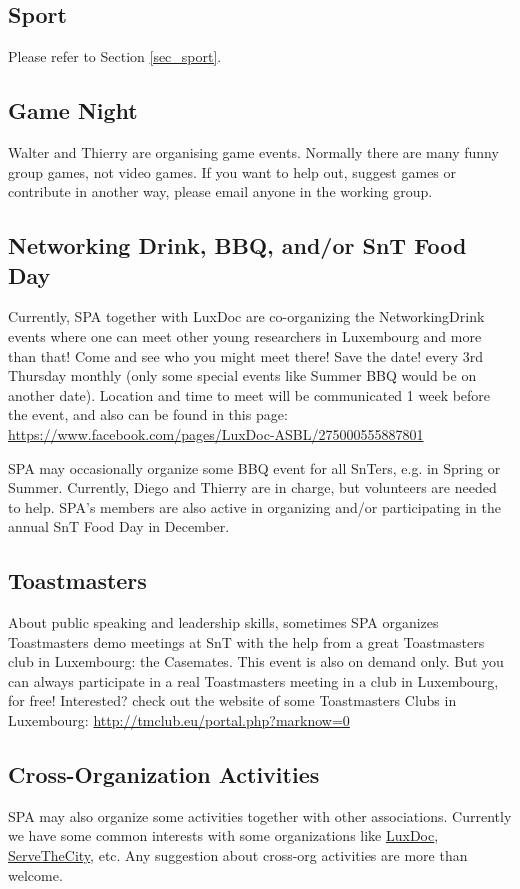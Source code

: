 \subsection{Sport}
Please refer to Section \ref{sec_sport}. 

\subsection{Game Night}
Walter and Thierry are organising game events. 
Normally there are many funny group games, not video games. 
If you want to help out, suggest games or contribute in another way, please email anyone in the working group.

\subsection{Networking Drink, BBQ, and/or SnT Food Day}
Currently, SPA together with LuxDoc are co-organizing the NetworkingDrink events where one can meet other young researchers in Luxembourg and more than that!
Come and see who you might meet there! 
Save the date! every 3rd Thursday monthly (only some special events like Summer BBQ would be on another date). 
Location and time to meet will be communicated 1 week before the event, and also can be found in this page: \href{https://www.facebook.com/pages/LuxDoc-ASBL/275000555887801}{https://www.facebook.com/pages/LuxDoc-ASBL/275000555887801}

SPA may occasionally organize some BBQ event for all SnTers, e.g. in Spring or Summer. 
Currently, Diego and Thierry are in charge, but volunteers are needed to help. 
SPA's members are also active in organizing and/or participating in the annual SnT Food Day in December. 


\subsection{Toastmasters}
About public speaking and leadership skills, sometimes SPA organizes Toastmasters demo meetings at SnT with the help from a great Toastmasters club in Luxembourg: the Casemates. 
This event is also on demand only. 
But you can always participate in a real Toastmasters meeting in a club in Luxembourg, for free!
Interested? check out the website of some Toastmasters Clubs in Luxembourg:  \href{http://tmclub.eu/portal.php?marknow=0}{http://tmclub.eu/portal.php?marknow=0}

\subsection{Cross-Organization Activities}
SPA may also organize some activities together with other associations. 
Currently we have some common interests with some organizations like \href{http://LuxDoc.org}{LuxDoc}, \href{http://servethecity.lu/}{ServeTheCity}, etc. 
Any suggestion about cross-org activities are more than welcome. 

